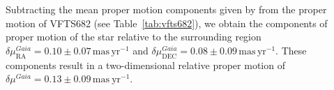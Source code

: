 \documentclass[apjl,twocolumn]{emulateapj}
\newcommand{\masyr}{\,\mathrm{mas}\,\mathrm{yr}^{-1}}
\DeclareRobustCommand{\Figref}[1]{Fig.~\ref{#1}}
\DeclareRobustCommand{\Tabref}[1]{Table~\ref{#1}}
\DeclareRobustCommand{\Secref}[1]{Sec.~\ref{#1}}
\begin{document}
Subtracting the mean proper motion components given by
\citet{lennon:18} from the
proper motion of VFTS682 (see \Tabref{tab:vfts682}), we obtain the
components of proper motion of the star relative to the surrounding region
$\delta\mu_\mathrm{RA}^{Gaia} = 0.10 \pm 0.07\masyr$
and $\delta\mu_\mathrm{DEC}^{Gaia} = 0.08
\pm 0.09\masyr$. These components result in a
two-dimensional relative proper motion of $\delta \mu^{Gaia}=0.13\pm 0.09\,\mathrm{mas\
  yr^{-1}}$.



\end{document}
